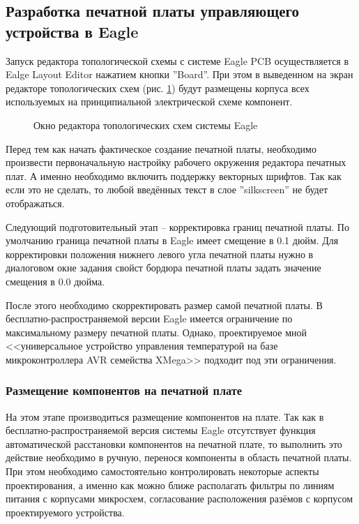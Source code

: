 \subsection{Разработка печатной платы управляющего устройства в Eagle}
Запуск редактора топологической схемы с системе Eagle PCB осуществляется в Ealge Layout Editor нажатием кнопки ''Board''.  При этом в выведенном на экран редакторе топологических схем (рис. \ref{img:boardEd}) будут размещены корпуса всех используемых на принципиальной электрической схеме компонент. 

\begin{figure}[h]
	\caption{Окно редактора топологических схем системы Eagle}
	\label{img:boardEd}
\end{figure}

Перед тем как начать фактическое создание печатной платы, необходимо произвести
первоначальную настройку рабочего окружения редактора печатных плат. А именно необходимо
включить поддержку векторных шрифтов. Так как если это не сделать, то любой введённых текст в
слое ''silkscreen'' не будет отображаться.

Следующий подготовительный этап -- корректировка границ печатной платы. По умолчанию граница
печатной платы в Eagle имеет смещение в 0.1 дюйм. Для корректировки положения
нижнего левого угла печатной платы нужно в диалоговом окне задания свойст бордюра
печатной платы задать значение смещения в 0.0 дюйма.

После этого необходимо скорректировать размер самой печатной платы. В
бесплатно-распространяемой версии Eagle имеется ограничение по максимальному размеру
печатной платы. Однако, проектируемое мной <<универсальное устройство управления
температурой на базе микроконтроллера AVR семейства XMega>> подходит под эти ограничения.

\subsubsection{Размещение компонентов на печатной плате}
На этом этапе производиться размещение компонентов на плате. Так как в
бесплатно-распространяемой версия системы Eagle отсутствует функция автоматической
расстановки компонентов на печатной плате, то выполнить это действие необходимо в ручную,
перенося компоненты в область печатной платы. При этом необходимо самостоятельно
контролировать некоторые аспекты проектирования, а именно как можно ближе располагать
фильтры по линиям питания с корпусами микросхем, согласование расположения разёмов с
корпусом проектируемого устройства.

